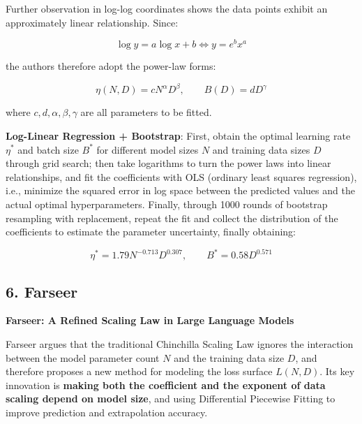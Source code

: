 \documentclass[
  english,
  11pt,
  a4paper,
]{article}
\newenvironment{NotesFormula}{%
  \par\noindent\begin{minipage}{\linewidth}%
  \setlength{\parindent}{2em}%
  \setlength{\parskip}{0.35em}%
}{\end{minipage}\par}
\begin{document}
\begin{NotesFormula}

Further observation in log-log coordinates shows the data points exhibit
an approximately linear relationship. Since:

\[\log y=a\log x+b\iff y=e^bx^a\]

\end{NotesFormula}

\begin{NotesFormula}

the authors therefore adopt the power-law forms:

\[\boxed{\eta(N,D)=cN^\alpha D^\beta},\qquad
\boxed{B(D)=dD^\gamma}\]

\end{NotesFormula}

where \(c,d,\alpha,\beta,\gamma\) are all parameters to be fitted.

\begin{NotesFormula}

\textbf{Log-Linear Regression + Bootstrap}: First, obtain the optimal
learning rate \(\eta^*\) and batch size \(B^*\) for different model
sizes \(N\) and training data sizes \(D\) through grid search; then take
logarithms to turn the power laws into linear relationships, and fit the
coefficients with OLS (ordinary least squares regression), i.e.,
minimize the squared error in log space between the predicted values and
the actual optimal hyperparameters. Finally, through 1000 rounds of
bootstrap resampling with replacement, repeat the fit and collect the
distribution of the coefficients to estimate the parameter uncertainty,
finally obtaining:

\[\boxed{\eta^*=1.79N^{-0.713}D^{0.307},\qquad B^*=0.58D^{0.571}}\]

\end{NotesFormula}

\clearpage

\subsection{6. Farseer}\label{farseer}

\textbf{Farseer: A Refined Scaling Law in Large Language Models}

Farseer argues that the traditional Chinchilla Scaling Law ignores the
interaction between the model parameter count \(N\) and the training
data size \(D\), and therefore proposes a new method for modeling the
loss surface \(L(N,D)\). Its key innovation is \textbf{making both the
coefficient and the exponent of data scaling depend on model size}, and
using Differential Piecewise Fitting to improve prediction and
extrapolation accuracy.
\end{document}
